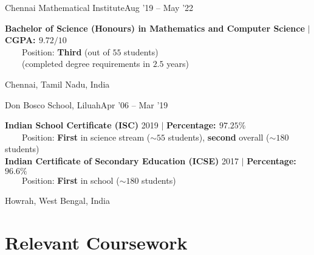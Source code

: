 \resumeSubheading
{Chennai Mathematical Institute}{Aug '19 -- May '22}
{\begin{minipage}{15cm} \color{grey}\textbf{Bachelor of Science (Honours) in Mathematics and Computer Science} $|$ \textbf{CGPA: $9.72/10$} \\
$\phantom{\qquad}$Position: \textbf{Third} (out of $55$ students)\\
$\phantom{\qquad}$(completed degree requirements in $2.5$ years) \end{minipage}
}{Chennai, Tamil Nadu, India}
\vspace{-5pt}
      
\resumeSubheading
{Don Bosco School, Liluah}{Apr '06 -- Mar '19}
{\begin{minipage}{15cm} \color{grey}\textbf{Indian School Certificate (ISC)} 2019 $|$ \textbf{Percentage: $97.25\%$} \\
$\phantom{\qquad}$Position: \textbf{First} in science stream ($\sim55$ students), \textbf{second} overall ($\sim180$ students) \\ 
\textbf{Indian Certificate of Secondary Education (ICSE)} 2017 $|$ \textbf{Percentage: $96.6\%$} \\
$\phantom{\qquad}$Position: \textbf{First} in school ($\sim180$ students) \end{minipage}
}{Howrah, West Bengal, India}
\vspace{\mygap}

\section{Relevant Coursework}

